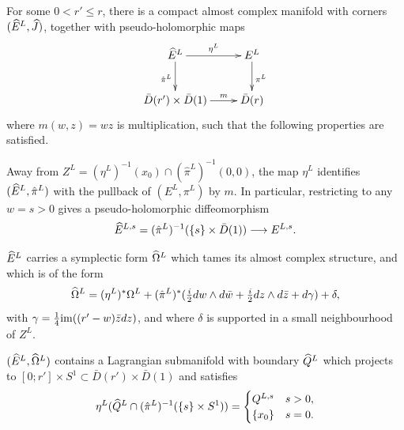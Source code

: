 \documentclass[10pt,letterpaper]{article}
\begin{document}
\begin{lemma} \label{th:resolution}
For some $0<r'\leq r$, there is a compact almost complex manifold with corners
$(\widehat{E}^L,\widehat{J})$, together with pseudo-holomorphic maps
\[
\xymatrix{
 {\hatE^L} \ar[r]^{\eta^L} \ar[d]_{\hat\pi^L} & {E^L} \ar[d]^{\pi^L} \\
 {\bar{D}(r') \times \bar{D}(1)} \ar[r]^-{m} & {\bar{D}(r)}
}
\]
where $m(w,z) = wz$ is multiplication, such that the following properties are
satisfied.
\begin{romanlist}
\item \label{item:resolution-one}
Away from $Z^L = (\eta^L)^{-1}(x_0) \cap (\hat\pi^L)^{-1}(0,0)$, the map
$\eta^L$ identifies $(\widehat{E}^L,\hat\pi^L)$ with the pullback of $(E^L,\pi^L)$ by
$m$. In particular, restricting to any $w = s>0$ gives a pseudo-holomorphic
diffeomorphism
\[
 \widehat{E}^{L,s} = (\hat\pi^L)^{-1}(\{s\} \times \bar{D}(1))
 \longrightarrow E^{L,s}.
\]
\item \label{item:resolution-two}
$\widehat{E}^L$ carries a symplectic form $\widehat{\Omega}^L$ which tames its almost complex
structure, and which is of the form
\[
 \widehat{\Omega}^L = (\eta^L)^*\Omega^L + (\hat\pi^L)^*(
 \textstyle\frac{i}{2} dw \wedge d\bar{w} +
 \frac{i}{2} dz \wedge d\bar{z} + d\gamma) + \delta,
\]
with $\gamma = \frac{1}{4} \mathrm{im}((r'-w)\bar{z}dz)$, and where $\delta$ is
supported in a small neighbourhood of $Z^L$.

\item \label{item:resolution-three}
$(\widehat{E}^L,\widehat{\Omega}^L)$ contains a Lagrangian submanifold with boundary $\widehat{Q}^L$
which projects to $[0;r'] \times S^1 \subset \bar{D}(r') \times \bar{D}(1)$ and
satisfies
\[
\eta^L(\widehat{Q}^L \cap (\hat\pi^L)^{-1}(\{s\} \times S^1)) = \begin{cases} Q^{L,s}
& s>0,
\\ \{x_0\} & s = 0.
\end{cases}
\]
\end{romanlist}
\end{lemma}
\end{document}
